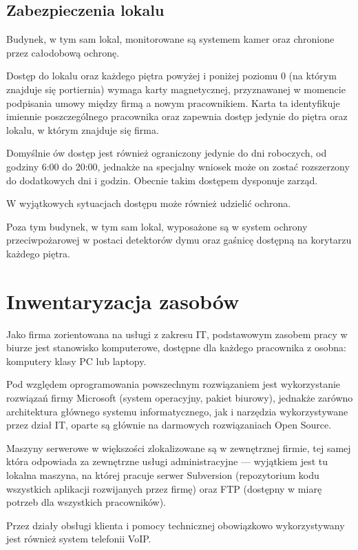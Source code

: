 \documentclass{article}
\begin{document}
        \subsection{Zabezpieczenia lokalu}
            Budynek, w tym sam lokal, monitorowane są systemem kamer oraz chronione przez całodobową ochronę.

            Dostęp do lokalu oraz każdego piętra powyżej i poniżej poziomu 0 (na którym znajduje się portiernia) wymaga karty magnetycznej, przyznawanej w momencie podpisania umowy między firmą a nowym pracownikiem. Karta ta identyfikuje imiennie poszczególnego pracownika oraz zapewnia dostęp jedynie do piętra oraz lokalu, w którym znajduje się firma.

            Domyślnie ów dostęp jest również ograniczony jedynie do dni roboczych, od godziny 6:00 do 20:00, jednakże na specjalny wniosek może on zostać rozszerzony do dodatkowych dni i godzin. Obecnie takim dostępem dysponuje zarząd.

            W wyjątkowych sytuacjach dostępu może również udzielić ochrona.

            Poza tym budynek, w tym sam lokal, wyposażone są w system ochrony przeciwpożarowej w postaci detektorów dymu oraz gaśnicę dostępną na korytarzu każdego piętra.

    \newpage
    \section{Inwentaryzacja zasobów}
        Jako firma zorientowana na usługi z zakresu IT, podstawowym zasobem pracy w biurze jest stanowisko komputerowe, dostępne dla każdego pracownika z osobna: komputery klasy PC lub laptopy.

        Pod względem oprogramowania powszechnym rozwiązaniem jest wykorzystanie rozwiązań firmy Microsoft (system operacyjny, pakiet biurowy), jednakże zarówno architektura głównego systemu informatycznego, jak i narzędzia wykorzystywane przez dział IT, oparte są głównie na darmowych rozwiązaniach Open Source.

        Maszyny serwerowe w większości zlokalizowane są w zewnętrznej firmie, tej samej która odpowiada za zewnętrzne usługi administracyjne --- wyjątkiem jest tu lokalna maszyna, na której pracuje serwer Subversion (repozytorium kodu wszystkich aplikacji rozwijanych przez firmę) oraz FTP (dostępny w miarę potrzeb dla wszystkich pracowników).

        Przez działy obsługi klienta i pomocy technicznej obowiązkowo wykorzystywany jest również system telefonii VoIP.
\end{document}
